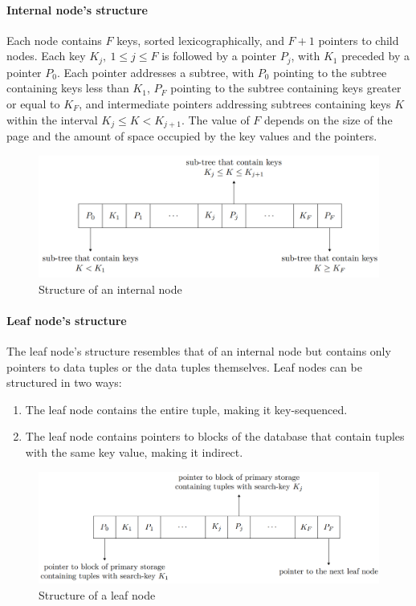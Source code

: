 \paragraph*{Internal node's structure}
Each node contains $F$ keys, sorted lexicographically, and $F+1$ pointers to child nodes.
Each key $K_j, \: 1 \leq j \leq F$ is followed by a pointer $P_j$, with  $K_1$ preceded by a pointer $P_0$.
Each pointer addresses a subtree, with $P_0$ pointing to the subtree containing keys less than $K_1$, $P_F$ pointing to the subtree containing keys greater or equal to $K_F$, and intermediate pointers addressing subtrees containing keys $K$ within the interval $K_j \leq K < K_{j + 1}$.
The value of $F$ depends on the size of the page and the amount of space occupied by the key values and the pointers.
\begin{figure}[H]
    \centering
    \includegraphics[width=0.75\linewidth]{images/int.png}
    \caption{Structure of an internal node}
\end{figure} 

\paragraph*{Leaf node's structure}
The leaf node's structure resembles that of an internal node but contains only pointers to data tuples or the data tuples themselves. 
Leaf nodes can be structured in two ways:
\begin{enumerate}
  \item The leaf node contains the entire tuple, making it key-sequenced.
  \item The leaf node contains pointers to blocks of the database that contain tuples with the same key value, making it indirect.
\end{enumerate}
\begin{figure}[H]
    \centering
    \includegraphics[width=0.75\linewidth]{images/ext.png}
    \caption{Structure of a leaf node}
\end{figure} 

